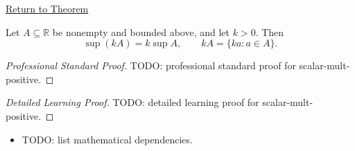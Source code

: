\newpage
{}
\label{prf:scalar-mult-positive}

\begin{remark*}[Return]
\hyperref[thm:scalar-mult-positive]{Return to Theorem}
\end{remark*}

\begin{theorem*}
Let $A\subseteq\mathbb{R}$ be nonempty and bounded above, and let $k>0$. Then
\[
  \sup(kA)=k\sup A,
  \qquad
  kA=\{ka:a\in A\}.
\]
\end{theorem*}

\begin{proof}[Professional Standard Proof]
\LRAProofBodyStart
TODO: professional standard proof for scalar-mult-positive.
\end{proof}

\begin{proof}[Detailed Learning Proof]
\LRAProofBodyStart
TODO: detailed learning proof for scalar-mult-positive.
\end{proof}

\begin{remark*}
\end{remark*}

\begin{dependencies}
\begin{itemize}
  \item TODO: list mathematical dependencies.
\end{itemize}
\end{dependencies}

\clearpage
